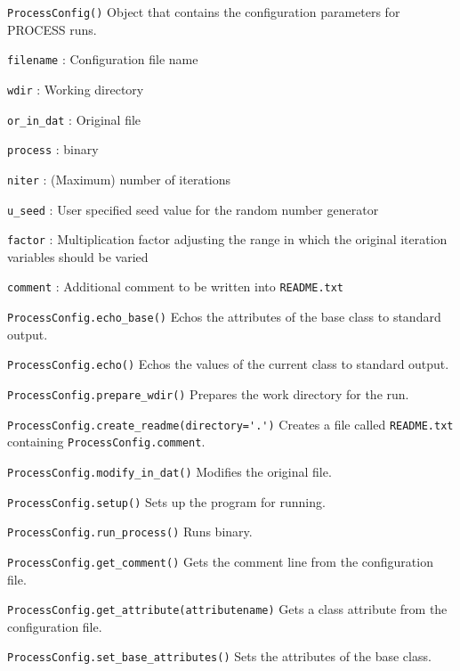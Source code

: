 \begin{description}

\item{\verb|ProcessConfig()|} Object that contains the configuration
  parameters for PROCESS runs.

  \verb|filename| : Configuration file name

  \verb|wdir| : Working directory

  \verb|or_in_dat| : Original \indat\/ file

  \verb|process| : \process\/ binary

  \verb|niter| : (Maximum) number of iterations

  \verb|u_seed| : User specified seed value for the random number generator

  \verb|factor| : Multiplication factor adjusting the range in which the
  original iteration variables should be varied

  \verb|comment| : Additional comment to be written into \verb|README.txt|

\item{\verb|ProcessConfig.echo_base()|} Echos the attributes of the base class
  to standard output.

\item{\verb|ProcessConfig.echo()|} Echos the values of the current class to
  standard output.

\item{\verb|ProcessConfig.prepare_wdir()|} Prepares the work directory for the
  run.

\item{\verb|ProcessConfig.create_readme(directory='.')|} Creates a file called
  \texttt{README.txt} containing \texttt{ProcessConfig.comment}.

\item{\verb|ProcessConfig.modify_in_dat()|} Modifies the original \indat\/
  file.

\item{\verb|ProcessConfig.setup()|} Sets up the program for running.

\item{\verb|ProcessConfig.run_process()|} Runs \process\/ binary.

\item{\verb|ProcessConfig.get_comment()|} Gets the comment line from the
  configuration file.

\item{\verb|ProcessConfig.get_attribute(attributename)|} Gets a class
  attribute from the configuration file.

\item{\verb|ProcessConfig.set_base_attributes()|} Sets the attributes of the
  base class.

\end{description}

